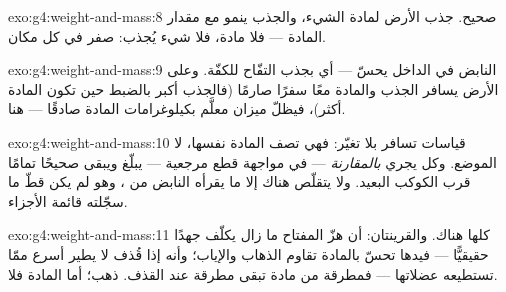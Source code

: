 \begin{solution}{exo:g4:weight-and-mass:8}
صحيح.  جذب الأرض لمادة الشيء، والجذب ينمو مع مقدار
المادة --- فلا مادة، فلا شيء يُجذب:  صفر في كل مكان.
\end{solution}

\begin{solution}{exo:g4:weight-and-mass:9}
النابض في الداخل يحسّ \emph{} --- أي بجذب التفّاح للكفّة.
وعلى الأرض يسافر الجذب والمادة معًا سفرًا صارمًا (فالجذب أكبر
بالضبط حين تكون المادة أكثر)، فيظلّ ميزان معلَّم بكيلوغرامات
المادة صادقًا --- هنا.
\end{solution}

\begin{solution}{exo:g4:weight-and-mass:10}
قياسات  تسافر بلا تغيّر: فهي تصف المادة نفسها، لا الموضع.
وكل  يجري \emph{بالمقارنة} ---  في مواجهة قطع
مرجعية --- يبلّغ  ويبقى صحيحًا تمامًا قرب الكوكب البعيد.
ولا يتقلّص هناك إلا ما يقرأه النابض من ، وهو لم يكن قطّ ما
سجّلته قائمة الأجزاء.
\end{solution}

\begin{solution}{exo:g4:weight-and-mass:11}
 كلها هناك. والقرينتان: أن هزّ المفتاح ما زال يكلّف جهدًا
حقيقيًّا --- فيدها تحسّ بالمادة تقاوم الذهاب والإياب؛ وأنه إذا
قُذف لا يطير أسرع ممّا تستطيعه عضلاتها --- فمطرقة من مادة تبقى
مطرقة عند القذف.  ذهب؛ أما المادة فلا.
\end{solution}
